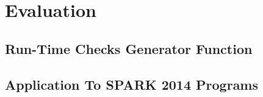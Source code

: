 \section{Evaluation}
\subsection{Run-Time Checks Generator Function}

\subsection{Application To SPARK 2014 Programs}
